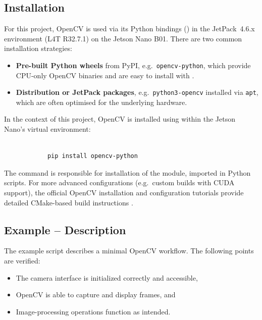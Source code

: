 \subsection{Installation}

For this project, OpenCV is used via its Python bindings () in the JetPack~4.6.x environment (L4T R32.7.1) on the Jetson Nano B01. There are two common installation strategies:

\begin{itemize}
	\item \textbf{Pre-built Python wheels} from PyPI, e.g.\ \texttt{opencv-python}, which provide CPU-only OpenCV binaries and are easy to install with  \cite{opencv_pypi}.
	\item \textbf{Distribution or JetPack packages}, e.g.\ \texttt{python3-opencv} installed via \texttt{apt}, which are often optimised for the underlying hardware.
\end{itemize}

In the context of this project, OpenCV is installed using  within the Jetson Nano’s virtual environment:

\begin{tcolorbox}[colback=white,colframe=black,coltext= ShellColor, sharp corners, boxrule=0.8pt]
	\begin{small}
		\begin{verbatim}
			
			pip install opencv-python	\end{verbatim}
	\end{small}
\end{tcolorbox}



The command is responsible for installation of the  module, imported in Python scripts. For more advanced configurations (e.g.\ custom builds with CUDA support), the official OpenCV installation and configuration tutorials provide detailed CMake-based build instructions \cite{opencv_config_ref,opencv_py_tutorial_root}.


\subsection{Example -- Description}

The example script  describes a minimal OpenCV workflow. The following points are verified:
\begin{itemize}
	\item The camera interface is initialized correctly and accessible,
	\item OpenCV is able to capture and display frames, and
	\item Image-processing operations function as intended.
\end{itemize}

